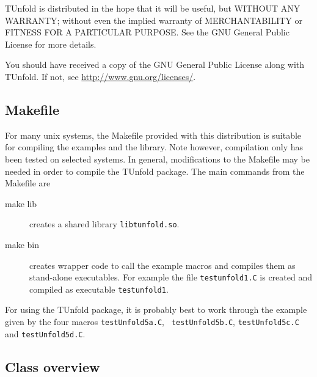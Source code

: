 \documentclass[12pt]{article}
\begin{document}
TUnfold is distributed in the hope that it will be useful,
but WITHOUT ANY WARRANTY; without even the implied warranty of
MERCHANTABILITY or FITNESS FOR A PARTICULAR PURPOSE.  See the
GNU General Public License for more details.

You should have received a copy of the GNU General Public License
along with TUnfold.  If not, see \url{http://www.gnu.org/licenses/}.
\subsection{Makefile}

For many unix systems, the Makefile provided with this distribution
is suitable for compiling the examples and the library. Note however,
compilation only has been 
tested on selected systems. In general, modifications to the Makefile
may be needed in order to compile the TUnfold package.
The main commands from the Makefile are
\begin{description}
\item[make lib] creates a shared library {\tt libtunfold.so}.
\item[make bin] creates wrapper code to call the example macros and
  compiles them as stand-alone executables. For example the file
  {\tt testunfold1.C} is created and compiled as executable {\tt testunfold1}.
\end{description}
For using the TUnfold package, it is probably best to work through the
example given by the four macros {\tt testUnfold5a.C}, {\tt
  testUnfold5b.C}, {\tt testUnfold5c.C} and {\tt testUnfold5d.C}.

\subsection{Class overview}
\end{document}
